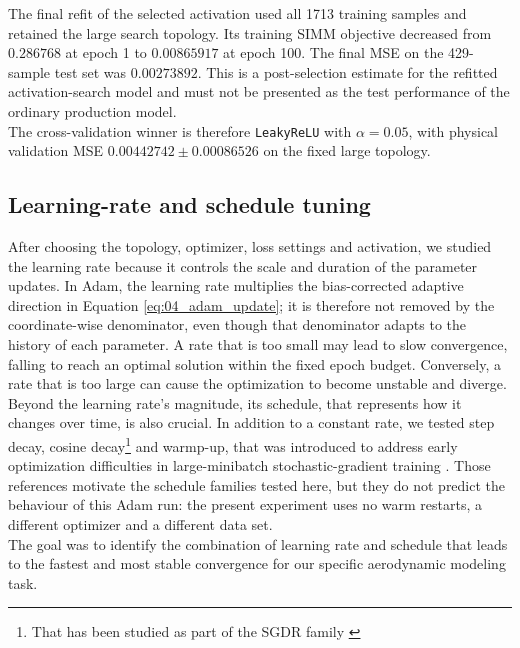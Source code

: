 The final refit of the selected activation used all 1713 training samples and retained the large search topology. Its training SIMM objective decreased from $0.286768$ at epoch 1 to $0.00865917$ at epoch 100. The final MSE on the 429-sample test set was $0.00273892$. This is a post-selection estimate for the refitted activation-search model and must not be presented as the test performance of the ordinary production model.\\

The cross-validation winner is therefore \texttt{LeakyReLU} with $\alpha=0.05$, with physical validation MSE $0.00442742\pm0.00086526$ on the fixed large topology.

\subsection{Learning-rate and schedule tuning}
\label{sec:04_learning_rate_tuning}

After choosing the topology, optimizer, loss settings and activation, we studied the learning rate because it controls the scale and duration of the parameter updates. In Adam, the learning rate multiplies the bias-corrected adaptive direction in Equation \eqref{eq:04_adam_update}; it is therefore not removed by the coordinate-wise denominator, even though that denominator adapts to the history of each parameter. A rate that is too small may lead to slow convergence, falling to reach an optimal solution within the fixed epoch budget. Conversely, a rate that is too large can cause the optimization to become unstable and diverge.\\

Beyond the learning rate's magnitude, its schedule, that represents how it changes over time, is also crucial. In addition to a constant rate, we tested step decay, cosine decay\footnote{That has been studied as part of the SGDR family \citep{loshchilov2017sgdr}} and warmp-up, that was introduced to address early optimization difficulties in large-minibatch stochastic-gradient training \citep{goyal2017accurate}. Those references motivate the schedule families tested here, but they do not predict the behaviour of this Adam run: the present experiment uses no warm restarts, a different optimizer and a different data set.\\

The goal was to identify the combination of learning rate and schedule that leads to the fastest and most stable convergence for our specific aerodynamic modeling task.\\

